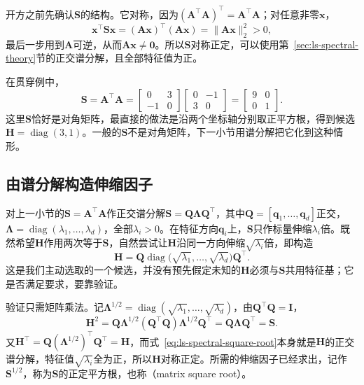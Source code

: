 开方之前先确认$\bm S$的结构。它对称，因为$(\bm A^\top\bm A)^\top=\bm A^\top\bm A$；对任意非零$\bm x$，
\[
 \bm x^\top\bm S\bm x=(\bm A\bm x)^\top(\bm A\bm x)=\lVert\bm A\bm x\rVert_2^2>0,
\]
最后一步用到$\bm A$可逆，从而$\bm A\bm x\neq\bm0$。所以$\bm S$对称正定，可以使用第~\ref{sec:ls-spectral-theory}节的正交谱分解，且全部特征值为正。

在贯穿例中，
\[
 \bm S=\bm A^\top\bm A
 =\begin{bmatrix}0&3\\-1&0\end{bmatrix}
 \begin{bmatrix}0&-1\\3&0\end{bmatrix}
 =\begin{bmatrix}9&0\\0&1\end{bmatrix}.
\]
这里$\bm S$恰好是对角矩阵，最直接的做法是沿两个坐标轴分别取正平方根，得到候选$\bm H=\operatorname{diag}(3,1)$。一般的$\bm S$不是对角矩阵，下一小节用谱分解把它化到这种情形。

\subsection{由谱分解构造伸缩因子}
\label{sec:ls-matrix-square-root}

对上一小节的$\bm S=\bm A^\top\bm A$作正交谱分解$\bm S=\bm Q\bm\Lambda\bm Q^\top$，其中$\bm Q=[\bm q_1,\ldots,\bm q_d]$正交，$\bm\Lambda=\operatorname{diag}(\lambda_1,\ldots,\lambda_d)$，全部$\lambda_i>0$。在特征方向$\bm q_i$上，$\bm S$只作标量伸缩$\lambda_i$倍。既然希望$\bm H$作用两次等于$\bm S$，自然尝试让$\bm H$沿同一方向伸缩$\sqrt{\lambda_i}$倍，即构造
\begin{equation}
 \bm H=\bm Q\operatorname{diag}\bigl(\sqrt{\lambda_1},\ldots,\sqrt{\lambda_d}\bigr)\bm Q^\top .
 \label{eq:ls-spectral-square-root}
\end{equation}
这是我们主动选取的一个候选，并没有预先假定未知的$\bm H$必须与$\bm S$共用特征基；它是否满足要求，要靠验证。

验证只需矩阵乘法。记$\bm\Lambda^{1/2}=\operatorname{diag}(\sqrt{\lambda_1},\ldots,\sqrt{\lambda_d})$，由$\bm Q^\top\bm Q=\bm I$，
\[
 \bm H^2
 =\bm Q\bm\Lambda^{1/2}(\bm Q^\top\bm Q)\bm\Lambda^{1/2}\bm Q^\top
 =\bm Q\bm\Lambda\bm Q^\top
 =\bm S .
\]
又$\bm H^\top=\bm Q(\bm\Lambda^{1/2})^\top\bm Q^\top=\bm H$，而式~\eqref{eq:ls-spectral-square-root}本身就是$\bm H$的正交谱分解，特征值$\sqrt{\lambda_i}$全为正，所以$\bm H$对称正定。所需的伸缩因子已经求出，记作$\bm S^{1/2}$，称为$\bm S$的正定平方根，也称（matrix square root）。

